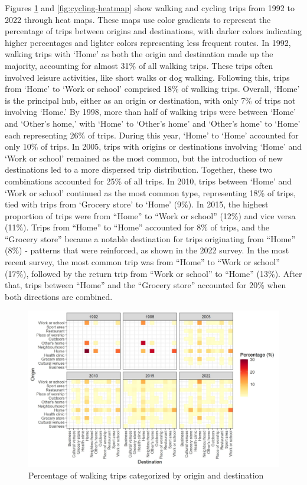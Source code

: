 \documentclass[preprint, 3p,
authoryear]{elsarticle} %
\begin{document}
Figures \ref{fig:walking-heatmap} and \ref{fig:cycling-heatmap} show
walking and cycling trips from 1992 to 2022 through heat maps. These
maps use color gradients to represent the percentage of trips between
origins and destinations, with darker colors indicating higher
percentages and lighter colors representing less frequent routes. In
1992, walking trips with `Home' as both the origin and destination made
up the majority, accounting for almost 31\% of all walking trips. These
trips often involved leisure activities, like short walks or dog
walking. Following this, trips from `Home' to `Work or school' comprised
18\% of walking trips. Overall, `Home' is the principal hub, either as
an origin or destination, with only 7\% of trips not involving `Home.'
By 1998, more than half of walking trips were between `Home' and
`Other's home,' with `Home' to `Other's home' and `Other's home' to
`Home' each representing 26\% of trips. During this year, `Home' to
`Home' accounted for only 10\% of trips. In 2005, trips with origins or
destinations involving `Home' and `Work or school' remained as the most
common, but the introduction of new destinations led to a more dispersed
trip distribution. Together, these two combinations accounted for 25\%
of all trips. In 2010, trips between `Home' and `Work or school'
continued as the most common type, representing 18\% of trips, tied with
trips from `Grocery store' to `Home' (9\%). In 2015, the highest
proportion of trips were from ``Home'' to ``Work or school'' (12\%) and
vice versa (11\%). Trips from ``Home'' to ``Home'' accounted for 8\% of
trips, and the ``Grocery store'' became a notable destination for trips
originating from ``Home'' (8\%) - patterns that were reinforced, as
shown in the 2022 survey. In the most recent survey, the most common
trip was from ``Home'' to ``Work or school'' (17\%), followed by the
return trip from ``Work or school'' to ``Home'' (13\%). After that,
trips between ``Home'' and the ``Grocery store'' accounted for 20\% when
both directions are combined.

\begin{figure}
\includegraphics[width=1\linewidth]{figures/walking_hm_fig} \caption{Percentage of walking trips categorized by origin and destination}\label{fig:walking-heatmap}
\end{figure}
\end{document}
